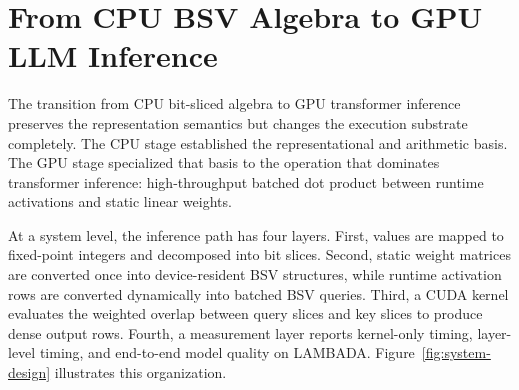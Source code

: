 \section{From CPU BSV Algebra to GPU LLM Inference}\label{sec:cpu-to-gpu}
The transition from CPU bit-sliced algebra to GPU transformer inference preserves the representation semantics but changes the execution substrate completely. The CPU stage established the representational and arithmetic basis. The GPU stage specialized that basis to the operation that dominates transformer inference: high-throughput batched dot product between runtime activations and static linear weights.

At a system level, the inference path has four layers. First, values are mapped to fixed-point integers and decomposed into bit slices. Second, static weight matrices are converted once into device-resident BSV structures, while runtime activation rows are converted dynamically into batched BSV queries. Third, a CUDA kernel evaluates the weighted overlap between query slices and key slices to produce dense output rows. Fourth, a measurement layer reports kernel-only timing, layer-level timing, and end-to-end model quality on LAMBADA. Figure~\ref{fig:system-design} illustrates this organization.

